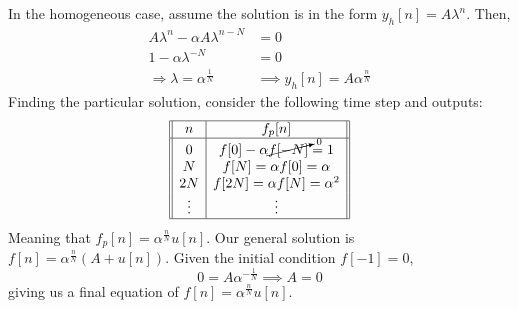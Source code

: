 \documentclass{article}
\begin{document}
\subsection{}

In the homogeneous case, assume the solution is in the form \(y_h[n] = A \lambda^n\).
Then,
\begin{align}
    A\lambda^n - \alpha A \lambda^{n - N} &= 0 \\
    1 - \alpha \lambda^{-N} &= 0 \\
    \Rightarrow \lambda = \alpha^{\frac{1}{N}} &\implies y_h[n] = A \alpha^{\frac{n}{N}}
\end{align}
Finding the particular solution, consider the following time step and outputs:
\begin{equation}
    \begin{array}[]{||c|c||}
        \hline
        n & f_p[n] \\
        \hline
        0 & f[0] - \alpha \cancelto{0}{f[-N]} = 1 \\
        N & f[N] = \alpha f[0] = \alpha \\
        2N & f[2N] = \alpha f[N] = \alpha^2 \\
        \vdots & \vdots \\
        \hline
    \end{array}
\end{equation}
Meaning that \(f_p[n] = \alpha^{\frac{n}{N}}u[n]\).
Our general solution is \(f[n] = \alpha^{\frac{n}{N}} (A + u[n])\).
Given the initial condition \(f[-1] = 0\),
\begin{equation}
    0 = A \alpha^{-\frac{1}{N}} \implies A = 0
\end{equation}
giving us a final equation of \(f[n] = \alpha^{\frac{n}{N}} u[n]\).

\subsection{}
\end{document}
